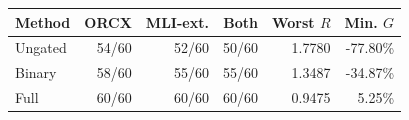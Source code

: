 \begin{tabular}{lrrrrr}
\toprule
Method & ORCX & MLI-ext. & Both & Worst $R$ & Min. $G$ \\
\midrule
Ungated & 54/60 & 52/60 & 50/60 & 1.7780 & -77.80\% \\
Binary & 58/60 & 55/60 & 55/60 & 1.3487 & -34.87\% \\
Full & 60/60 & 60/60 & 60/60 & 0.9475 & 5.25\% \\
\bottomrule
\end{tabular}
